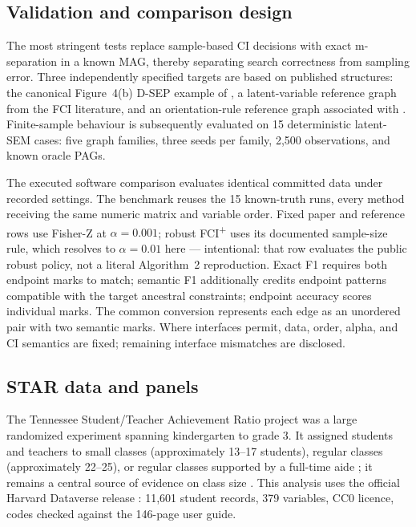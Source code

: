 \documentclass[11pt,a4paper]{article}
\theoremstyle{definition}
\newcommand{\FCIplus}{FCI\textsuperscript{+}}
\begin{document}
\subsection{Validation and comparison design}

The most stringent tests replace sample-based CI decisions with exact
m-separation in a known MAG, thereby separating search correctness from
sampling error. Three independently specified targets are based on published
structures: the
canonical Figure~4(b) D-SEP example of \citet{claassen2013learning}, a
latent-variable reference graph from the FCI literature, and an
orientation-rule reference graph associated with
\citet{zhang2008completeness}. Finite-sample behaviour is subsequently
evaluated on 15 deterministic latent-SEM cases: five graph families, three
seeds per family, 2,500 observations, and known oracle PAGs.

The executed software comparison evaluates identical committed data under
recorded settings. The benchmark reuses the 15 known-truth runs, every
method receiving the same numeric matrix and variable order. Fixed paper and
reference rows use Fisher-Z at \(\alpha = 0.001\); robust \FCIplus{} uses
its documented sample-size rule, which resolves to \(\alpha = 0.01\) here
--- intentional: that row evaluates the public robust policy, not a literal
Algorithm~2 reproduction. Exact F1 requires both endpoint marks to match;
semantic F1 additionally credits endpoint patterns compatible with the
target ancestral constraints; endpoint accuracy scores individual marks. The
common conversion represents each edge as an unordered pair with two semantic
marks. Where interfaces permit, data, order, alpha, and CI semantics are
fixed; remaining interface mismatches are disclosed.

\subsection{STAR data and panels}

The Tennessee Student/Teacher Achievement Ratio project was a large
randomized experiment spanning kindergarten to grade 3. It assigned students
and teachers to small classes (approximately 13--17 students), regular
classes (approximately 22--25), or regular classes supported by a full-time
aide
\citep{word1990star}; it remains a central source of evidence on class size
\citep{krueger1999experimental}. This analysis uses the official Harvard
Dataverse release \citep{achilles2008star}: 11,601 student records, 379
variables, CC0 licence, codes checked against the 146-page user guide.
\end{document}
